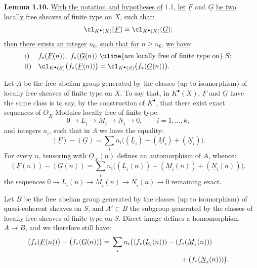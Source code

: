 %
\textbf{Lemma 1.10.} \uline{With the notation and hypotheses of} 1.1, \uline{let} \(\underline{F}\) and \(\underline{G}\) \uline{be two locally free sheaves of finite type on} \(X\), \uline{such that}:
\[
  \cl_{K^{\bullet}(X)}(\underline{F})=\cl_{K^{\bullet}(X)}(\underline{G});
\]
\uline{then there exists an integer} \(n_0\), \uline{such that for} \(n\geq n_0\), \uline{we have}:
\[
\begin{array}{ll}
\text{i)}& f_*(\underline{F}(n)),\ f_*(\underline{G}(n))\text{ \uline{are locally free of finite type on} }S;\\[1mm]
\text{ii)}& \cl_{K^{\bullet}(S)}\bigl(f_*(\underline{F}(n))\bigr)=\cl_{K^{\bullet}(S)}\bigl(f_*(\underline{G}(n))\bigr).
\end{array}
\]

Let \(A\) be the free abelian group generated by the classes (up to isomorphism) of locally free sheaves of finite type on \(X\). To say that, in \(K^{\bullet}(X)\), \(\underline{F}\) and \(\underline{G}\) have the same class is to say, by the construction of \(K^{\bullet}\), that there exist exact sequences of \(\underline{O}_X\)-Modules locally free of finite type:
\[
  0\longrightarrow \underline{L}_i\longrightarrow \underline{M}_i\longrightarrow \underline{N}_i\longrightarrow 0,
  \qquad i=1,\ldots,k,
\]
and integers \(n_i\), such that in \(A\) we have the equality:
\[
  (\underline{F})-(\underline{G})=\sum_i n_i\bigl((\underline{L}_i)-(\underline{M}_i)+(\underline{N}_i)\bigr).
\]
For every \(n\), tensoring with \(\underline{O}_X(n)\) defines an automorphism of \(A\), whence:
\[
  (\underline{F}(n))-(\underline{G}(n))=\sum_i n_i\bigl((\underline{L}_i(n))-(\underline{M}_i(n))+(\underline{N}_i(n))\bigr),
\]
the sequences \(0\to \underline{L}_i(n)\to \underline{M}_i(n)\to \underline{N}_i(n)\to0\) remaining exact.

Let \(B\) be the free abelian group generated by the classes (up to isomorphism) of quasi-coherent sheaves on \(S\), and \(A'\subset B\) the subgroup generated by the classes of locally free sheaves of finite type on \(S\). Direct image defines a homomorphism \(A\to B\), and we therefore still have:
%
\[
\begin{aligned}
  \bigl(f_*(\underline{F}(n))\bigr)-\bigl(f_*(\underline{G}(n))\bigr)
  ={}&\sum_i n_i\bigl((f_*(\underline{L}_i(n)))-(f_*(\underline{M}_i(n)))\\
      &\hspace{35mm}+(f_*(\underline{N}_i(n)))\bigr).
\end{aligned}
\]

